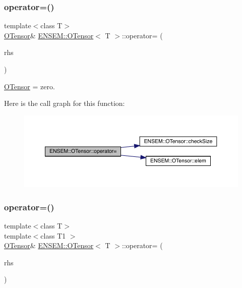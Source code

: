 \subsubsection{\texorpdfstring{operator=()}{operator=()}\hspace{0.1cm}{\footnotesize\ttfamily [2/8]}}
{\footnotesize\ttfamily template$<$class T$>$ \\
\mbox{\hyperlink{classENSEM_1_1OTensor}{O\+Tensor}}\& \mbox{\hyperlink{classENSEM_1_1OTensor}{E\+N\+S\+E\+M\+::\+O\+Tensor}}$<$ T $>$\+::operator= (\begin{DoxyParamCaption}\item[{const \mbox{\hyperlink{structENSEM_1_1Zero}{Zero}} \&}]{rhs }\end{DoxyParamCaption})\hspace{0.3cm}{\ttfamily [inline]}}



\mbox{\hyperlink{classENSEM_1_1OTensor}{O\+Tensor}} = zero. 

Here is the call graph for this function\+:
\nopagebreak
\begin{figure}[H]
\begin{center}
\leavevmode
\includegraphics[width=350pt]{da/d8a/classENSEM_1_1OTensor_aae562552ce915d3d39c65dfe463fa50a_cgraph}
\end{center}
\end{figure}
\mbox{\label{classENSEM_1_1OTensor_ae763ca68be1d6b8d5b27b8d544ab5f2d}} 
\subsubsection{\texorpdfstring{operator=()}{operator=()}\hspace{0.1cm}{\footnotesize\ttfamily [3/8]}}
{\footnotesize\ttfamily template$<$class T$>$ \\
template$<$class T1 $>$ \\
\mbox{\hyperlink{classENSEM_1_1OTensor}{O\+Tensor}}\& \mbox{\hyperlink{classENSEM_1_1OTensor}{E\+N\+S\+E\+M\+::\+O\+Tensor}}$<$ T $>$\+::operator= (\begin{DoxyParamCaption}\item[{const \mbox{\hyperlink{classENSEM_1_1OScalar}{O\+Scalar}}$<$ T1 $>$ \&}]{rhs }\end{DoxyParamCaption})\hspace{0.3cm}{\ttfamily [inline]}}




